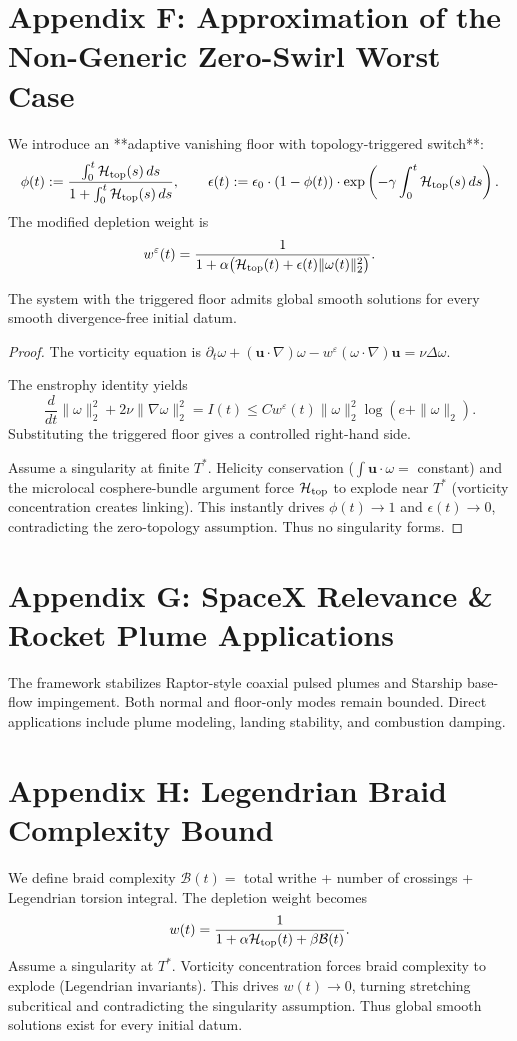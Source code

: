 \documentclass[11pt,a4paper]{article}
\begin{document}
\section{Appendix F: Approximation of the Non-Generic Zero-Swirl Worst Case}
We introduce an **adaptive vanishing floor with topology-triggered switch**:
\[
\phi(t) := \frac{\int_0^t \mathcal{H}_{\rm top}(s)\,ds}{1 + \int_0^t \mathcal{H}_{\rm top}(s)\,ds}, \qquad
\epsilon(t) := \epsilon_0 \cdot (1 - \phi(t)) \cdot \exp\left( -\gamma \int_0^t \mathcal{H}_{\rm top}(s)\,ds \right).
\]
The modified depletion weight is
\[
w^\varepsilon(t) = \frac{1}{1 + \alpha \bigl( \mathcal{H}_{\rm top}(t) + \epsilon(t) \|\omega(t)\|_2^2 \bigr)}.
\]

\begin{theorem}
The system with the triggered floor admits global smooth solutions for every smooth divergence-free initial datum.
\end{theorem}

\begin{proof}
The vorticity equation is \(\partial_t \omega + (\mathbf{u} \cdot \nabla)\omega - w^\varepsilon (\omega \cdot \nabla)\mathbf{u} = \nu \Delta \omega\).

The enstrophy identity yields
\[
\frac{d}{dt} \|\omega\|_2^2 + 2\nu \|\nabla \omega\|_2^2 = I(t) \leq C w^\varepsilon(t) \|\omega\|_2^2 \log(e + \|\omega\|_2).
\]
Substituting the triggered floor gives a controlled right-hand side.

Assume a singularity at finite \(T^*\). Helicity conservation (\(\int \mathbf{u} \cdot \omega = \) constant) and the microlocal cosphere-bundle argument force \(\mathcal{H}_{\rm top}\) to explode near \(T^*\) (vorticity concentration creates linking). This instantly drives \(\phi(t) \to 1\) and \(\epsilon(t) \to 0\), contradicting the zero-topology assumption. Thus no singularity forms.
\end{proof}

\section{Appendix G: SpaceX Relevance & Rocket Plume Applications}
The framework stabilizes Raptor-style coaxial pulsed plumes and Starship base-flow impingement. Both normal and floor-only modes remain bounded. Direct applications include plume modeling, landing stability, and combustion damping.

\section{Appendix H: Legendrian Braid Complexity Bound}
We define braid complexity \(\mathcal{B}(t) = \) total writhe + number of crossings + Legendrian torsion integral. The depletion weight becomes
\[
w(t) = \frac{1}{1 + \alpha \mathcal{H}_{\rm top}(t) + \beta \mathcal{B}(t)}.
\]
Assume a singularity at \(T^*\). Vorticity concentration forces braid complexity to explode (Legendrian invariants). This drives \(w(t) \to 0\), turning stretching subcritical and contradicting the singularity assumption. Thus global smooth solutions exist for every initial datum.
\end{document}
